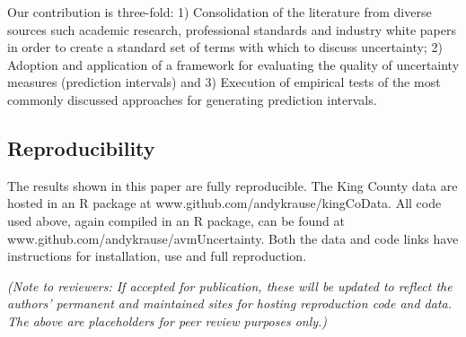\documentclass[colTwo]{anon}
\theoremstyle{definition}
\begin{document}
Our contribution is three-fold: 1) Consolidation of the literature from diverse sources such academic research, professional standards and industry white papers in order to create a standard set of terms with which to discuss uncertainty; 2) Adoption and application of a framework for evaluating the quality of uncertainty measures (prediction intervals) and 3) Execution of empirical tests of the most commonly discussed approaches for generating prediction intervals.

\subsection{Reproducibility}

The results shown in this paper are fully reproducible.  The King County data are hosted in an R package at www.github.com/andykrause/kingCoData.  All code used above, again compiled in an R package, can be found at www.github.com/andykrause/avmUncertainty.  Both the data and code links have instructions for installation, use and full reproduction.

\textit{(Note to reviewers: If accepted for publication, these will be updated to reflect the authors’ permanent and maintained sites for hosting reproduction code and data. The above are placeholders for peer review purposes only.)}
\end{document}
